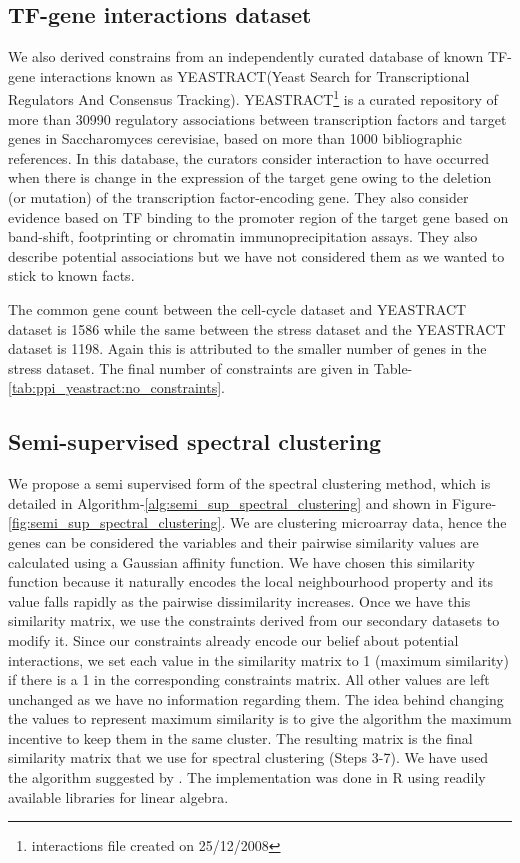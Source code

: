 \subsection{TF-gene interactions dataset} \label{yeastract-db}
We also derived constrains from an independently curated database of known TF-gene interactions known as YEASTRACT(Yeast Search for Transcriptional Regulators And Consensus Tracking). YEASTRACT\footnote{interactions file created on 25/12/2008} \citep{Teixeira06yeastract} is a curated repository of more than 30990 regulatory associations between transcription factors and target genes in Saccharomyces cerevisiae, based on more than 1000 bibliographic references. In this database, the curators consider interaction to have occurred when there is change in the expression of the target gene owing to the deletion (or mutation) of the transcription factor-encoding gene. They also consider evidence based on TF binding to the promoter region of the target gene based on band-shift, footprinting or chromatin immunoprecipitation assays. They also describe potential associations but we have not considered them as we wanted to stick to known facts. 

The common gene count between the cell-cycle dataset and YEASTRACT dataset is 1586 while the same between the stress dataset and the YEASTRACT dataset is 1198. Again this is attributed to the smaller number of genes in the stress dataset. The final number of constraints are given in Table-\ref{tab:ppi_yeastract:no_constraints}.

\subsection{Semi-supervised spectral clustering} \label{sec:sssc}
We propose a semi supervised form of the spectral clustering method, which is detailed in Algorithm-\ref{alg:semi_sup_spectral_clustering} and shown in Figure-\ref{fig:semi_sup_spectral_clustering}. We are clustering microarray data, hence the genes can be considered the variables and their pairwise similarity values are calculated using a Gaussian affinity function. We have chosen this similarity function because it naturally encodes the local neighbourhood property and its value falls rapidly as the pairwise dissimilarity increases. Once we have this similarity matrix, we use the constraints derived from our secondary datasets to modify it. Since our constraints already encode our belief about potential interactions, we set each value in the similarity matrix to 1 (maximum similarity) if there is a 1 in the corresponding constraints matrix. All other values are left unchanged as we have no information regarding them. The idea behind changing the values to represent maximum similarity is to give the algorithm the maximum incentive to keep them in the same cluster. The resulting matrix is the final similarity matrix that we use for spectral clustering (Steps 3-7). We have used the algorithm suggested by \citet{ng2001onspectral}. The implementation was done in R using readily available libraries for linear algebra. 

